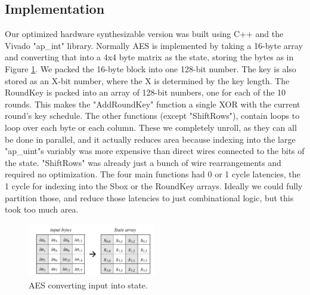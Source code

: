 \subsection{Implementation}
Our optimized hardware synthesizable version was built using C++ and the Vivado "ap_int" library.
Normally AES is implemented by taking a 16-byte array and converting that into a 4x4 byte matrix as the state, storing the bytes as in Figure \ref{fig:aesstate}.
We packed the 16-byte block into one 128-bit number. The key is also stored as an X-bit number, where the X is determined by the key length.
The RoundKey is packed into an array of 128-bit numbers, one for each of the 10 rounds.
This makes the "AddRoundKey" function a single XOR with the current round's key schedule.
The other functions (except "ShiftRows"), contain loops to loop over each byte or each column.
These we completely unroll, as they can all be done in parallel, and it actually reduces area because indexing into the large "ap_uint"s variably was more expensive than direct wires connected to the bits of the state.
"ShiftRows" was already just a bunch of wire rearrangements and required no optimization.
The four main functions had 0 or 1 cycle latencies, the 1 cycle for indexing into the Sbox or the RoundKey arrays.
Ideally we could fully partition those, and reduce those latencies to just combinational logic, but this took too much area. 

\begin{figure}[h]
\centering
\includegraphics[width=0.5\textwidth]{aesstate}
\caption{AES converting input into state.}
\label{fig:aesstate}
\end{figure}

